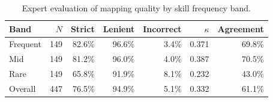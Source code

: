 \begin{table}[htbp]
  \centering
  \caption{Expert evaluation of mapping quality by skill frequency band.}
  \label{tab:expert}
  \begin{tabular}{lrrrrrr}
    \toprule
    Band & $N$ & Strict & Lenient & Incorrect & $\kappa$ & Agreement \\
    \midrule
  Frequent & 149 & 82.6\% & 96.6\% & 3.4\% & 0.371 & 69.8\% \\
  Mid & 149 & 81.2\% & 96.0\% & 4.0\% & 0.387 & 70.5\% \\
  Rare & 149 & 65.8\% & 91.9\% & 8.1\% & 0.232 & 43.0\% \\
    \midrule
  Overall & 447 & 76.5\% & 94.9\% & 5.1\% & 0.332 & 61.1\% \\
    \bottomrule
  \end{tabular}
\end{table}